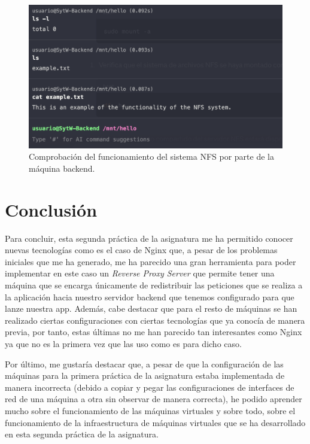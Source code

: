 \documentclass{report}
\begin{document}
  \begin{figure}[H]
    \centering
    \includegraphics[scale=0.6]{Capturas-Informe-2-STW/Funcionamiento-sistema-NFS-Backend.png}
    \caption{Comprobación del funcionamiento del sistema NFS por parte de la máquina backend.}
    \label{fig:Comprobación-NFS-Backend}
  \end{figure}

  \chapter{Conclusión}
  Para concluir, esta segunda práctica de la asignatura me ha permitido conocer nuevas tecnologías como es el caso de Nginx que, a pesar de los problemas iniciales que me ha generado, me ha parecido una gran herramienta para poder implementar en este caso un \emph{Reverse Proxy Server} que permite tener una máquina que se encarga únicamente de redistribuir las peticiones que se realiza a la aplicación hacia nuestro servidor backend que tenemos configurado para que lanze nuestra app. Además, cabe destacar que para el resto de máquinas se han realizado ciertas configuraciones con ciertas tecnologías que ya conocía de manera previa, por tanto, estas últimas no me han parecido tan interesantes como Nginx ya que no es la primera vez que las uso como es para dicho caso. 
  
  Por último, me gustaría destacar que, a pesar de que la configuración de las máquinas para la primera práctica de la asignatura estaba implementada de manera incorrecta (debido a copiar y pegar las configuraciones de interfaces de red de una máquina a otra sin observar de manera correcta), he podido aprender mucho sobre el funcionamiento de las máquinas virtuales y sobre todo, sobre el funcionamiento de la infraestructura de máquinas virtuales que se ha desarrollado en esta segunda práctica de la asignatura.

  
\end{document}
